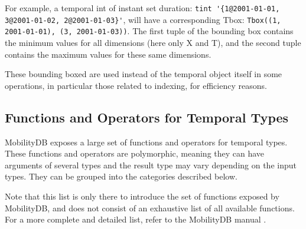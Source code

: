 For example, a temporal int of instant set duration: \lstinline+tint '{1@2001-01-01, 3@2001-01-02, 2@2001-01-03}'+, will have a corresponding Tbox: \lstinline{Tbox((1, 2001-01-01), (3, 2001-01-03))}. The first tuple of the bounding box contains the minimum values for all dimensions (here only X and T), and the second tuple contains the maximum values  for these same dimensions.

These bounding boxed are used instead of the temporal object itself in some operations, in particular those related to indexing, for efficiency reasons.

\subsection{Functions and Operators for Temporal Types}
\label{section:mobilitydb_functions}

MobilityDB exposes a large set of functions and operators for temporal types. These functions and operators are polymorphic, meaning they can have arguments of several types and the result type may vary depending on the input types. They can be grouped into the categories described below. 

Note that this list is only there to introduce the set of functions exposed by MobilityDB, and does not consist of an exhaustive list of all available functions. For a more complete and detailed list, refer to the MobilityDB manual \cite{mobiliydb_manual}.

